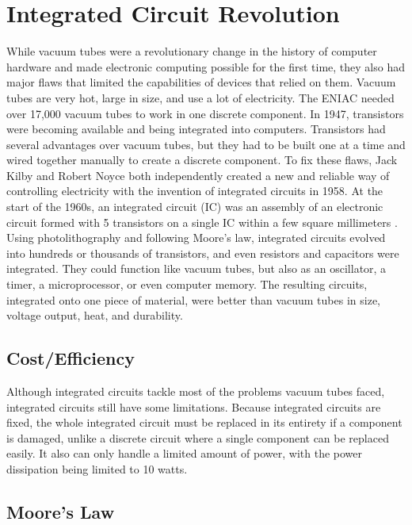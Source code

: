 \documentclass[letterpaper, 10 pt, conference]{IEEEconf}
\begin{document}

\section{Integrated Circuit Revolution}

While vacuum tubes were a revolutionary change in the history of computer hardware and made electronic computing possible for the first time, they also had major flaws that limited the capabilities of devices that relied on them. Vacuum tubes are very hot, large in size, and use a lot of electricity. The ENIAC needed over 17,000 vacuum tubes to work in one discrete component. In 1947, transistors were becoming available and being integrated into computers. Transistors had several advantages over vacuum tubes, but they had to be built one at a time and wired together manually to create a discrete component. To fix these flaws, Jack Kilby and Robert Noyce both independently created a new and reliable way of controlling electricity with the invention of integrated circuits in 1958. At the start of the 1960s, an integrated circuit (IC) was an assembly of an electronic circuit formed with 5 transistors on a single IC within a few square millimeters . Using photolithography and following Moore’s law, integrated circuits evolved into hundreds or thousands of transistors, and even resistors and capacitors were integrated. They could function like vacuum tubes, but also as an oscillator, a timer, a microprocessor, or even computer memory. The resulting circuits, integrated onto one piece of material, were better than vacuum tubes in size, voltage output, heat, and durability.

\subsection{Cost/Efficiency}
Although integrated circuits tackle most of the problems vacuum tubes faced, integrated circuits still have some limitations. Because integrated circuits are fixed, the whole integrated circuit must be replaced in its entirety if a component is damaged, unlike a discrete circuit where a single component can be replaced easily. It also can only handle a limited amount of power, with the power dissipation being limited to 10 watts. 

\subsection{Moore's Law}
\end{document}
